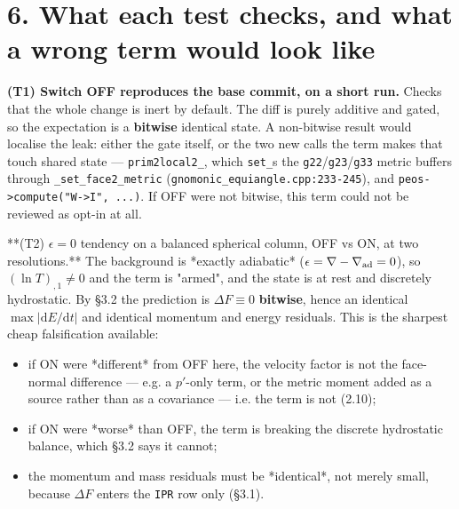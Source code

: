 \documentclass[11pt,a4paper]{article}
\begin{document}
\hrulefill

\section*{6. What each test checks, and what a wrong term would look like}

\textbf{(T1) Switch OFF reproduces the base commit, on a short run.}
Checks that the whole change is inert by default. The diff is purely additive and
gated, so the expectation is a \textbf{bitwise} identical state. A non-bitwise result
would localise the leak: either the gate itself, or the two new calls the term
makes that touch shared state — \texttt{prim2local2\_}, which \texttt{set\_}s the
\texttt{g22}/\texttt{g23}/\texttt{g33} metric buffers through \texttt{\_set\_face2\_metric}
(\texttt{gnomonic\_equiangle.cpp:233-245}), and \texttt{peos->compute("W->I", ...)}. If OFF were
not bitwise, this term could not be reviewed as opt-in at all.

**(T2) $\epsilon=0$ tendency on a balanced spherical column, OFF vs ON, at two
resolutions.** The background is *exactly adiabatic*
($\epsilon=\nabla-\nabla_{\rm ad}=0$), so $(\ln T)_{,1}\neq0$ and the term is
"armed", and the state is at rest and discretely hydrostatic. By §3.2 the
prediction is $\Delta F\equiv0$ \textbf{bitwise}, hence an identical
$\max|\mathrm{d}E/\mathrm{d}t|$ and identical momentum and energy residuals. This
is the sharpest cheap falsification available:

\begin{itemize}
\item if ON were *different* from OFF here, the velocity factor is not the face-normal
  difference — e.g. a $p'$-only term, or the metric moment added as a source
  rather than as a covariance — i.e. the term is not (2.10);
\item if ON were *worse* than OFF, the term is breaking the discrete hydrostatic
  balance, which §3.2 says it cannot;
\item the momentum and mass residuals must be *identical*, not merely small, because
  $\Delta F$ enters the \texttt{IPR} row only (§3.1).
\end{itemize}
\end{document}
